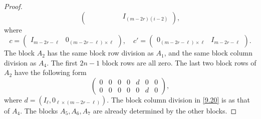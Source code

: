 \documentclass[12pts]{amsart}
\begin{document}
\begin{proof}
\begin{equation}
\begin{pmatrix}
&&&&&&I_{(m-2r)(i-2)}\end{pmatrix},
\end{equation}
where 
$$
c=\begin{pmatrix}I_{m-2r-\ell}&0_{(m-2r-\ell)\times \ell}\end{pmatrix}, \quad c'=\begin{pmatrix}0_{(m-2r-\ell)\times \ell}&I_{m-2r-\ell}\end{pmatrix}.
$$
The block $A_2$ has the same block row division as $A_1$, and the same block column division as $A_4$. The first $2n-1$ block rows are all zero. The last two block rows of $A_2$ have the following form
\begin{equation}\label{9.20}
\begin{pmatrix}0&0&0&0&d&0&0\\0&0&0&0&0&d&0\end{pmatrix},
\end{equation}
where $d=(I_\ell,0_{\ell\times (m-2r-\ell)})$. The block column division in \eqref{9.20} is as that of $A_4$.
The blocks $A_5, A_6, A_7$ are already determined by the other blocks.


\end{proof}
\end{document}
